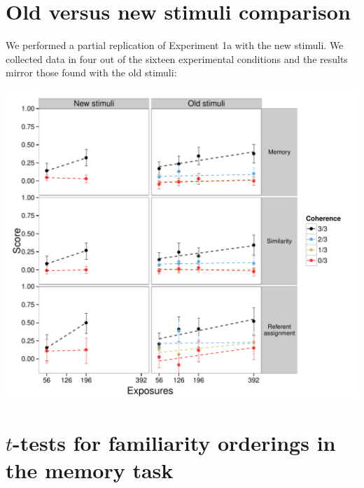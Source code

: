 \documentclass[man,floatsintext]{apa6}
\begin{document}
\newpage



\appendix
\section{Old versus new stimuli comparison}
\label{old-vs-new}

We performed a partial replication of Experiment 1a with the new stimuli. We collected data in four out of the sixteen experimental conditions and the results mirror those found with the old stimuli:

\begin{center}
\includegraphics[width=0.9\linewidth]{stim-comparison} \\

\end{center}



\appendix
\section{$t$-tests for familiarity orderings in the memory task}
\end{document}
